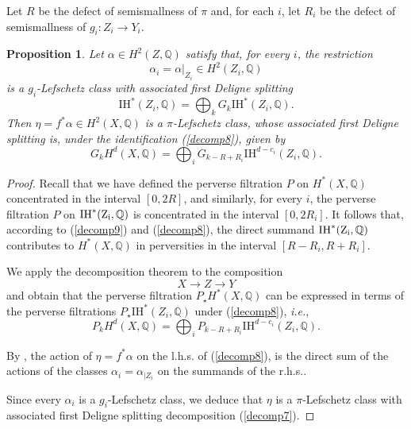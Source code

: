 \documentclass[11pt]{amsart}
\theoremstyle{plain}
\newtheorem{prop}[thm]{Proposition}
\theoremstyle{definition}
\theoremstyle{remark}
\newcommand{\BQ}{{\mathbb{Q}}}
\begin{document}
Let ${R}$ be the defect of semismallness of $\pi$ and, for each $i$, let ${R_i}$ be the defect of semismallness of $g_i:Z_i \to Y_i$.

\begin{prop}\label{proposition3.5}
Let  $\alpha \in H^2(Z, \BQ)$ satisfy that, for every $i$,   the restriction
\[
\alpha_i = \alpha|_{Z_i} \in H^2(Z_i, \BQ)
\]
is a $g_i$-Lefschetz class  with associated  first Deligne splitting 
\[
\mathrm{IH}^*(Z_i, \BQ) = \bigoplus_k G_k \mathrm{IH}^*(Z_i, \BQ).
\]
Then $\eta = f^*\alpha \in H^2(X, \BQ)$ is a $\pi$-Lefschetz class, whose associated first Deligne splitting is,
under the identification (\ref{decomp8}), given by
\begin{equation}\label{decomp7}
{G_kH^d(X, \BQ) = \bigoplus_i G_{k-R+{R_i}}\mathrm{IH}^{d-c_i}(Z_i, \BQ).}
\end{equation}
\end{prop}

\begin{proof}{Recall that we have defined the perverse filtration $P$ on $H^*(X,\BQ)$ concentrated in the interval $[0,{2R}]$,
and similarly,  for every $i$, the perverse filtration  $P$ on $\rm{IH}^*(Z_i,\BQ)$ is concentrated in the interval
$[0,{2R_i}]$. It follows that, according to  (\ref{decomp9}) and (\ref{decomp8}),  the direct summand $\rm{IH}^*(Z_i,\BQ)$ contributes to  
$H^*(X,\BQ)$ in perversities in the interval ${[R-R_i,R+R_i]}$.

We apply the decomposition theorem to the composition
\[
X \to Z \to Y
\]
and obtain that the perverse filtration $P_\star H^*(X, \BQ)$ can be expressed in terms of the perverse filtrations $P_\star \mathrm{IH}^*(Z_i, \BQ)$ under (\ref{decomp8}), \emph{i.e.},
\[
P_kH^d(X, \BQ) = \bigoplus_i P_{k-{R} +{R_i}}\mathrm{IH}^{d-c_i}(Z_i, \BQ).
\]


By \cite[Remark 4.4.3]{dCM0}, the action of $\eta=f^*\alpha$ on the l.h.s. of (\ref{decomp8}), is 
the direct sum of the actions of the classes $\alpha_i=\alpha_{|Z_i}$ on the summands of the r.h.s..


Since every $\alpha_i$ is a $g_i$-Lefschetz class, 
we deduce that $\eta$ is a $\pi$-Lefschetz class with associated first Deligne splitting decomposition (\ref{decomp7}).}
\end{proof}
\end{document}
